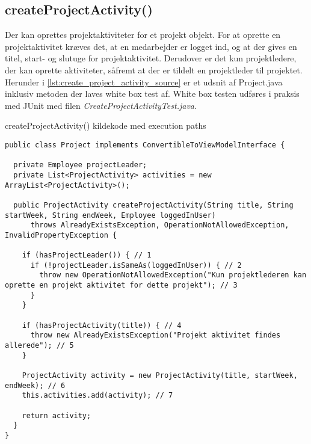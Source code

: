 \subsection{createProjectActivity() \label{chap:white_box_create_project_activity}}
Der kan oprettes projektaktiviteter for et projekt objekt. For at oprette en projektaktivitet kræves det, at en medarbejder er logget ind, og at der gives en titel, start- og slutuge for projektaktivitet. Derudover er det kun projektledere, der kan oprette aktiviteter, såfremt at der er tildelt en projektleder til projektet. Herunder i \ref{lst:create_project_activity_source} er et udsnit af Project.java inklusiv metoden der laves white box test af. White box testen udføres i praksis med JUnit med filen \textit{CreateProjectActivityTest.java}.
\begin{listing}[H]
  \centering
  \caption{createProjectActivity() kildekode med execution paths}\label{lst:create_project_activity_source}
  \begin{verbatim}
public class Project implements ConvertibleToViewModelInterface {

  private Employee projectLeader;
  private List<ProjectActivity> activities = new ArrayList<ProjectActivity>();

  public ProjectActivity createProjectActivity(String title, String startWeek, String endWeek, Employee loggedInUser)
      throws AlreadyExistsException, OperationNotAllowedException, InvalidPropertyException {
        
    if (hasProjectLeader()) { // 1
      if (!projectLeader.isSameAs(loggedInUser)) { // 2
        throw new OperationNotAllowedException("Kun projektlederen kan oprette en projekt aktivitet for dette projekt"); // 3
      }
    }
    
    if (hasProjectActivity(title)) { // 4
      throw new AlreadyExistsException("Projekt aktivitet findes allerede"); // 5
    }
    
    ProjectActivity activity = new ProjectActivity(title, startWeek, endWeek); // 6
    this.activities.add(activity); // 7

    return activity;
  } 
}
    \end{verbatim}
\end{listing}
